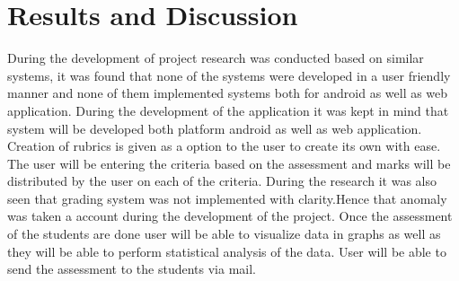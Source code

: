 \chapter{Results and Discussion }
During the development of project research was conducted based on similar systems, it was found that none of the systems were developed in a user friendly manner and none of them implemented systems both for android as well as web application.
During the development of the application it was kept in mind that system will be developed both platform android as well as web application.
Creation of rubrics is given as a option to the user to create its own with ease. The user will be entering the criteria based on the assessment and marks will be distributed by the user on each of the criteria.
During the research it was also seen that grading system was not implemented with clarity.Hence that anomaly was taken a account during the development of the project.
Once the assessment of the students are done user will be able to visualize data in graphs as well as they will be able to perform statistical analysis of the data. User will be able to send the assessment to the students via mail.
